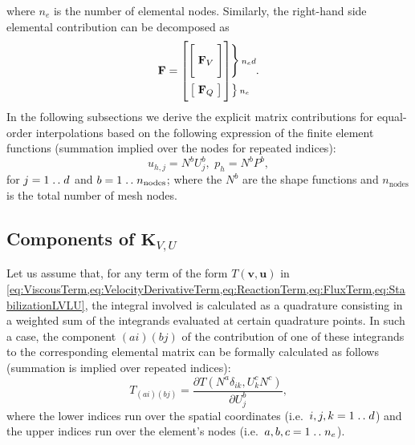 where $n_e$ is the number of elemental nodes.
Similarly, the right-hand side elemental contribution can be decomposed as
\begin{equation}
  \mathbf{F} =
  \begingroup %
  \setlength\arraycolsep{1.5pt}
  \begin{bmatrix}\mystrut(20,10)
    \begin{bmatrix} \makebox[2em]{$\Bigg.\mathbf{F}_{V}$} \end{bmatrix}
    \\[3ex] \mystrut(10,7)
    \begin{bmatrix} \makebox[2em]{$\mathbf{F}_{Q}$} \end{bmatrix}
  \end{bmatrix}\!\!
  \begin{matrix*}\mystrut(20,10)
    \left. \vphantom{\begin{matrix*} \makebox[2em]{$\Bigg.\mathbf{F}_{V}$} \end{matrix*}} \right \rbrace{\scriptstyle n_e d}
    \\[3ex] \mystrut(10,7)
    \left. \!\!\!\vphantom{\begin{matrix*} \makebox[2em]{$\mathbf{F}_{Q}$} \end{matrix*}} \right \rbrace{\scriptstyle n_e}
  \end{matrix*}
  \endgroup.
\end{equation}
In the following subsections we derive the explicit matrix contributions for equal-order interpolations based on the following expression of the finite element functions (summation implied over the nodes for repeated indices):
\begin{equation} \label{eq:FEfunction}
  u_{h,j} = N^b U^b_j, \,\, p_h = N^b P^b,
\end{equation}
for $j = 1 \mathrel{{.}\,{.}}\nobreak d$ and $b=1 \mathrel{{.}\,{.}}\nobreak n_{\mathrm{nodes}}$; where the $N^b$ are the shape functions and $n_{\mathrm{nodes}}$ is the total number of mesh nodes.
\subsection{Components of $\mathbf{K}_{V, U}$} \label{sec:KVUComponents}
Let us assume that, for any term of the form $T(\boldsymbol{v}, \boldsymbol{u})$ in \cref{eq:ViscousTerm,eq:VelocityDerivativeTerm,eq:ReactionTerm,eq:FluxTerm,eq:StabilizationLVLU}, the integral involved is calculated as a quadrature consisting in a weighted sum of the integrands evaluated at certain quadrature points. In such a case, the component $(ai)(bj)$ of the contribution of one of these integrands to the corresponding elemental matrix can be formally calculated as follows (summation is implied over repeated indices):
\begin{equation} \label{eq:GenericMatrixVU}
  T_{(ai)(bj)} = \frac{\partial T(N^a \delta_{ik}, U_k^c N^c)}{\partial U_j^b},
\end{equation}
where the lower indices run over the spatial coordinates (i.e.\, $i, j, k = 1 \mathrel{{.}\,{.}}\nobreak d$) and the upper indices run over the element's nodes (i.e.\, $a, b, c = 1 \mathrel{{.}\,{.}}\nobreak n_e$).

